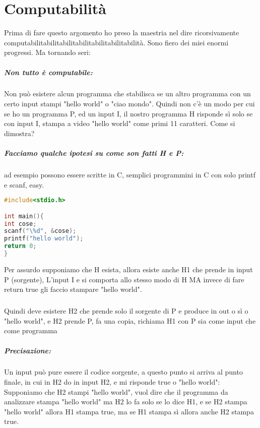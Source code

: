 \documentclass[12pt, a4paper, openany, oneside]{book}
\begin{document}
\chapter{Computabilità}
Prima di fare questo argomento ho preso la maestria nel dire ricorsivamente
computabilitabilitabilitabilitabilitabilitabilità. Sono fiero dei miei enormi
progressi. Ma tornando seri:
\paragraph{Non tutto è computabile:} Non può esistere alcun programma che 
stabilisca se un altro programma con un certo input stampi "hello world" o "ciao
mondo".
Quindi non c'è un modo per cui se ho un programma P, ed un input I, il nostro
programma H risponde sì solo se con input I, stampa a video "hello world" come 
primi 11 caratteri. Come si dimostra?
\paragraph{Facciamo qualche ipotesi su come son fatti H e P:} ad esempio possono
essere scritte in C, semplici programmini in C con solo printf e scanf, easy.
\begin{lstlisting}[language=C]
#include<stdio.h>

int main(){
int cose;
scanf("\%d", &cose);
printf("hello world");
return 0;
}
\end{lstlisting}
Per assurdo supponiamo che H esista, allora esiste anche H1 che prende in input
P (sorgente), L'input I e si comporta allo stesso modo di H MA invece di fare
return true gli faccio stampare "hello world". \paragraph{}Quindi deve esistere H2 che 
prende solo il sorgente di P e produce in out o sì o "hello world", e H2 prende
P, fa una copia, richiama H1 con P sia come input che come programma
\paragraph{Precisazione:} Un input può pure essere il codice sorgente, a questo
punto si arriva al punto finale, in cui in H2 do in input H2, e mi risponde true o
"hello world":\\
Supponiamo che H2 stampi "hello world", vuol dire che il programma da analizzare
stampa "hello world" ma H2 lo fa solo se lo dice H1, e se H2 stampa "hello world"
allora H1 stampa true, ma se H1 stampa sì allora anche H2 stampa true. 
\end{document}
